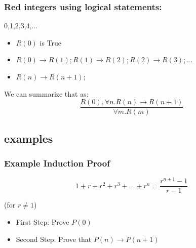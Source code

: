 \documentclass{beamer}
\begin{document}
\begin{frame}
  \frametitle{Red integers using logical statements:}
  {\larger
  \begin{center}
    \alert{0,1,2,3,4,...}
  \end{center}

  \bigskip

  \begin{itemize}
  \item $R(0)$ is True
  \item $R(0) \rightarrow R(1); R(1) \rightarrow R(2); R(2)
    \rightarrow R(3); ...$
  \item $R(n) \rightarrow R(n+1);$
  \end{itemize}

  We can summarize that as:
  \begin{equation*}
    \frac{R(0), \forall n. R(n)\rightarrow R(n+1)}{\forall m. R(m)}
  \end{equation*}
  
  }
\end{frame}

\subsection{examples}
\begin{frame}
  \frametitle{Example Induction Proof}
  {\larger
    \begin{equation*}
      1 + r + r^2 + r^3 + \ldots + r^n = \frac{r^{n+1}-1}{r-1}
    \end{equation*}

    \begin{center}
      (for $r \neq 1$)
    \end{center}
    
    \bigskip

    \begin{itemize}
    \item First Step: Prove $P(0)$
    \item Second Step: Prove that $P(n) \rightarrow P(n+1)$
    \end{itemize}
  }
\end{frame}
\end{document}

